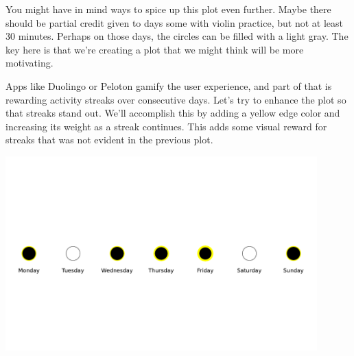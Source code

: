  You might have in mind ways to spice up this plot even further. Maybe there should be partial credit given to days some with violin practice, but not at least 30 minutes. Perhaps on those days, the circles can be filled with a light gray. The key here is that we're creating a plot that we might think will be more motivating. 
 
Apps like Duolingo or Peloton gamify the user experience, and part of that is rewarding activity streaks over consecutive days. Let's try to enhance the plot so that streaks stand out. We'll accomplish this by adding a yellow edge color and increasing its weight as a streak continues. This adds some visual reward for streaks that was not evident in the previous plot. 
 
 
 \begin{center}
     \includegraphics[width = 0.9\textwidth]{figures/poetryplots/violin-streak.pdf}
 \end{center}
